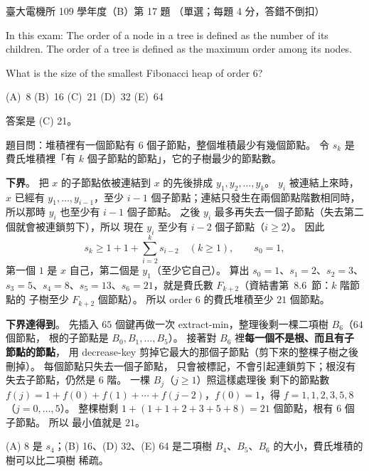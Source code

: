 \begin{pastexam}[label={px:ntu-109-ee-ds-17}]{臺大電機所 109 學年度（B）第 17 題}
（單選；每題 4 分，答錯不倒扣）

In this exam: The order of a node in a tree is defined as the number of its children. The order of
a tree is defined as the maximum order among its nodes.

What is the size of the smallest Fibonacci heap of order 6?

(A)~8 \qquad (B)~16 \qquad (C)~21 \qquad (D)~32 \qquad (E)~64
\end{pastexam}

\begin{pastsoln}
答案是 (C) 21。

題目問：堆積裡有一個節點有 $6$ 個子節點，整個堆積最少有幾個節點。 令 $s_k$ 是費氏堆積裡「有 $k$
個子節點的節點」，它的子樹最少的節點數。

\textbf{下界}。 把 $x$ 的子節點依被連結到 $x$ 的先後排成 $y_1, y_2, \ldots, y_k$。 $y_i$ 被連結上來時，
$x$ 已經有 $y_1, \ldots, y_{i-1}$，至少 $i - 1$ 個子節點；連結只發生在兩個節點階數相同時，所以那時
$y_i$ 也至少有 $i - 1$ 個子節點。 之後 $y_i$ 最多再失去一個子節點（失去第二個就會被連鎖剪下），所以
現在 $y_i$ 至少有 $i - 2$ 個子節點（$i \ge 2$）。 因此
\[
s_k \ge 1 + 1 + \sum_{i=2}^{k} s_{i-2} \quad (k \ge 1), \qquad s_0 = 1,
\]
第一個 $1$ 是 $x$ 自己，第二個是 $y_1$（至少它自己）。 算出 $s_0 = 1$、$s_1 = 2$、$s_2 = 3$、
$s_3 = 5$、$s_4 = 8$、$s_5 = 13$、$s_6 = 21$，就是費氏數 $F_{k+2}$（資結書第~8.6~節：$k$ 階節點的
子樹至少 $F_{k+2}$ 個節點）。 所以 order 6 的費氏堆積至少 $21$ 個節點。

\textbf{下界達得到}。 先插入 $65$ 個鍵再做一次 extract-min，整理後剩一棵二項樹 $B_6$（$64$ 個節點，
根的子節點是 $B_0, B_1, \ldots, B_5$）。 接著對 $B_6$ 裡\textbf{每一個不是根、而且有子節點的節點}，
用 decrease-key 剪掉它最大的那個子節點（剪下來的整棵子樹之後刪掉）。 每個節點只失去一個子節點，
只會被標記，不會引起連鎖剪下；根沒有失去子節點，仍然是 6 階。 一棵 $B_j$（$j \ge 1$）照這樣處理後
剩下的節點數 $f(j) = 1 + f(0) + f(1) + \cdots + f(j-2)$，$f(0) = 1$，得 $f = 1, 1, 2, 3, 5, 8$
（$j = 0, \ldots, 5$）。 整棵樹剩 $1 + (1 + 1 + 2 + 3 + 5 + 8) = 21$ 個節點，根有 $6$ 個子節點。 所以
最小值就是 $21$。

(A) 8 是 $s_4$；(B) 16、(D) 32、(E) 64 是二項樹 $B_4$、$B_5$、$B_6$ 的大小，費氏堆積的樹可以比二項樹
稀疏。
\end{pastsoln}
